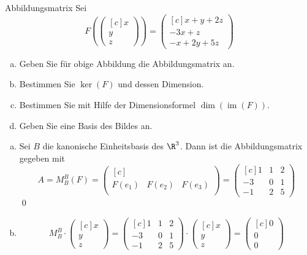 \documentclass[german]{../spicker}
\newcommand{\vektor}[1]{\begin{pmatrix*}[c] #1 \end{pmatrix*}}
\newcommand{\im}{\operatorname{im}}
\begin{document}
\begin{example}{Abbildungsmatrix}
    Sei
    $$
        F\left(\vektor{x\\y\\z}\right) = \vektor{x + y + 2z \\ -3x + z \\ -x + 2y + 5z}
    $$
    \begin{enumerate}[a)]
        \item Geben Sie für obige Abbildung die Abbildungsmatrix an.
        \item Bestimmen Sie $\ker(F)$ und dessen Dimension.
        \item Bestimmen Sie mit Hilfe der Dimensionsformel $\dim(\im (F))$.
        \item Geben Sie eine Basis des Bildes an.
    \end{enumerate}

    \exampleseparator

    \begin{enumerate}[a)]
        \item Sei $B$ die kanonische Einheitsbasis des $\R^3$.
              Dann ist die Abbildungsmatrix gegeben mit
              $$
                  A = M^B_B (F) = \vektor{~ \\F(e_1) & F(e_2) & F(e_3)\\ ~} = \vektor{1 & 1 & 2\\ -3 & 0 & 1\\ -1 & 2 & 5}
              $$\qed
        \item $$
                  M^B_B \cdot \vektor{x \\ y \\ z} = \vektor{1 & 1 & 2\\ -3 & 0 & 1\\ -1 & 2 & 5} \cdot \vektor{x \\ y \\ z} = \vektor{0 \\ 0 \\ 0}
              $$


\end{enumerate}
\end{example}
\end{document}
